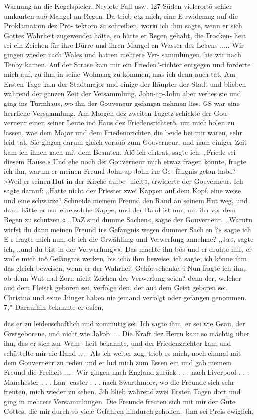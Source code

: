Warnung an die Kegclspieler. Noylote Fall usw. 127
Süden vielerortö schier umkanten auö Mangel an Regen. Da
trieb etz mich, eine E-rwidemng auf die Proklamation dez Pro-
tektorö zu schreiben, worin ich ihm sagte, wenn er sich Gottes
Wahrheit zugewendet hätte, so hätte er Regen gehabt, die Trocken-
heit sei ein Zeichen für ihre Dürre und ihren Mangel an Wasser
des Lebens .....
Wir gingen wieder nach Wales und hatten mehrere Ver-
sammlungen, bie wir nach Tenby kamen. Auf der Strase kam
mir ein Frieden?-richter entgegen und forderte mich auf, zu ihm
in seine Wohnung zu kommen, mas ich denn auch tat. Am
Ersten Tage kam der Stadtmajor und einige der Häupter der
Stadt und blieben während der ganzen Zeit der Versammlung.
John-ap-John aber verlies sie und ging ins Turmhaus, wo ihn
der Gouveneur gefangen nehmen lies. GS war eine herrliche
Versammlung. Am Morgen dez zweiten Tagetz schickte der Gou-
verneur einen seiner Leute inö Haus dez Friedensrichterö, um mich
holen zu lassen, wae dem Major und dem Friedenörichter, die
beide bei mir waren, sehr leid tat. Sie gingen darum gleich
vorauö zum Gouverneur, und nach einiger Zeit kam ich ihnen nach
mit dem Beamten. Alö ich eintrat, sagte ich: ,,Friede sei diesem
Hause.« Und ehe noch der Gouverneur mich etwaz fragen konnte,
fragte ich ihn, warum er meinen Freund John-ap-John ine Ge-
fängnis getan habe? »Weil er seinen Hut in der Kirche aufbe-
hielt«, erwiderte der Gouverneur. Ich sagte darauf: ,,Hatte nicht
der Priester zwei Kappen auf dem Kopf. eine weise und eine
schwarze? Schneide meinem Freund den Rand an seinem Hut
weg, und dann hätte er nur eine solche Kappe, und der Rand
ist nur, um ihn vor dem Regen zu schützen.« ,,DaZ sind dumme
Sachen«, sagte der Gouverneur. ,,Warutn wirfst du dann meinen
Freund ins Gefängnis wegen dummer Sach en ?« sagte ich. E-r fragte
mich nun, ob ich die Grwählimg und Verwerfung annehme?
,,Ja«, sagte ich, ,,und du bist in der Verwerfrmg««. Das machte
ihn bös und er drohte mir, er wolle mich inö Gefängnis werken,
bis ichö ihm beweise; ich sagte, ich könne ihm das gleich beweisen,
wenn er der Wahrheit Gehör schenke.-i Nun fragte ich ihn,. ob denn
Wut und Zorn nicht Zeichen der Verwerfung seien? denn der,
welcher auö dem Fleisch geboren sei, verfolge den, der auö dem
Geist geboren sei. Christuö und seine Jünger haben nie jemand
verfolgt oder gefangen genommen. 7,* Daraufhin bekannte er osfen,


das er zu leidenschaftlich und zommütig sei. Ich sagte ihm, er
sei wie Gsau, der Grstgeborene, und nicht wie Jakob .... Die
Kraft dez Herrn kam so mächtig über ihn, das er sich zur Wahr-
heit bekannte, und der Friedenzrichter kam und schüttelte mir
die Hand ..... Als ich weiter zog, trieb es mich, noch einmal
mit dem Gouverneur zu reden und er lud mich zum Essen ein
und gab meinem Freund die Freiheit ..,.. Wir gingen nach
England zurück . . . nach Liverpool . . . Manchester . . . Lan-
caster . . . nach Swarthmore, wo die Freunde sich sehr freuten,
mich wieder zu sehen. Jch blieb während zwei Ersten Tagen
dort und ging in mehrere Versammlungen. Die Freunde freuten
sich mit mir der Güte Gottes, die mir durch so viele Gefahren
hindurch geholfen. Jhm sei Preis ewiglich.
